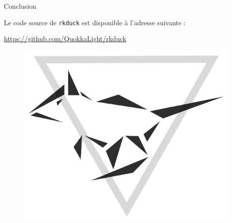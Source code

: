 \documentclass[10pt]{beamer}
\begin{document}
\begin{frame}{Conclusion}

  \begin{center}Le code source de \texttt{rkduck} est disponible à l'adresse suivante : \end{center}

  \begin{center}\url{https://github.com/QuokkaLight/rkduck}\end{center}
  
  \begin{figure}
	\begin{center}
	\includegraphics[scale=0.3]{logo_blk.png}
	\end{center}
  \end{figure}

\end{frame}


\end{document}
